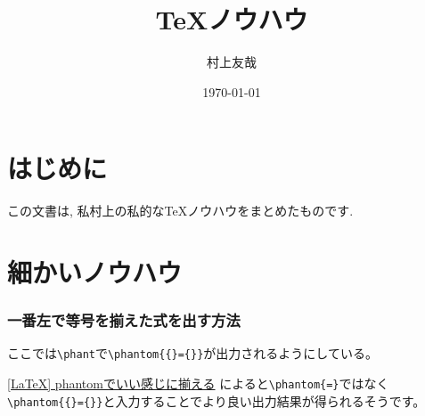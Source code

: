 \documentclass[11pt,a4paper,oneside,lualatex]{ltjsarticle} %
\numberwithin{equation}{section} %
\begin{document}

\title{TeXノウハウ}
\author{村上友哉}
\date{\today}
\maketitle



\section*{はじめに}


この文書は, 私村上の私的なTeXノウハウをまとめたものです. 

\tableofcontents


\section{細かいノウハウ} \label{sec:know-how}





\subsubsection{一番左で等号を揃えた式を出す方法}


ここでは\verb|\phant|で\verb|\phantom{{}={}}|が出力されるようにしている。

\href{https://qiita.com/zkou/items/21a2229bb900fd87e760#-%E3%82%92%E5%90%AB%E3%82%80%E4%BE%8B}{[LaTeX] phantomでいい感じに揃える}
によると\verb|\phantom{=}|ではなく\verb|\phantom{{}={}}|と入力することでより良い出力結果が得られるそうです。



\end{document}
